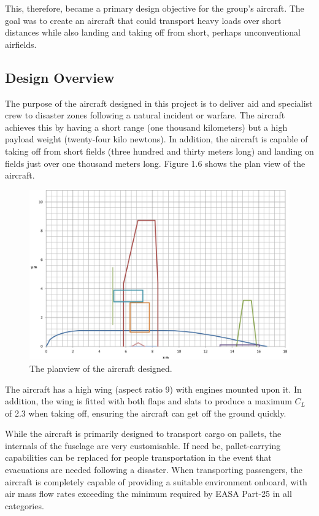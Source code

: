 \documentclass[stu, a4paper, 12pt, floatsintext]{apa7}
\numberwithin{figure}{section}
\numberwithin{table}{section}
\numberwithin{equation}{section}
\begin{document}
This, therefore, became a primary design objective for the group’s aircraft. The goal was to create an aircraft that could transport heavy loads over short distances while also landing and taking off from short, perhaps unconventional airfields.  

\subsection{Design Overview}

The purpose of the aircraft designed in this project is to deliver aid and specialist crew to disaster zones following a natural incident or warfare. The aircraft achieves this by having a short range (one thousand kilometers) but a high payload weight (twenty-four kilo newtons). In addition, the aircraft is capable of taking off from short fields (three hundred and thirty meters long) and landing on fields just over one thousand meters long.  Figure 1.6 shows the plan view of the aircraft.

\begin{figure}[H]
    \caption{The planview of the aircraft designed.}
    \label{fig:aircraft_planview}
    \centering
    \includegraphics[width=1.1\textwidth]{pictures/planview.jpg}
\end{figure}

The aircraft has a high wing (aspect ratio 9) with engines mounted upon it. In addition, the wing is fitted with both flaps and slats to produce a maximum $C_L$ of 2.3 when taking off, ensuring the aircraft can get off the ground quickly. 

While the aircraft is primarily designed to transport cargo on pallets, the internals of the fuselage are very customisable. If need be, pallet-carrying capabilities can be replaced for people transportation in the event that evacuations are needed following a disaster. When transporting passengers, the aircraft is completely capable of providing a suitable environment onboard, with air mass flow rates exceeding the minimum required by EASA Part-25 in all categories. 
\end{document}
